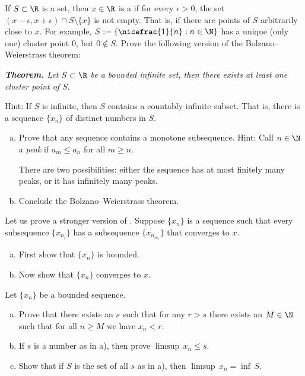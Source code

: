 \documentclass[12pt]{book}
\begin{document}
\begin{exercise}
If $S \subset \R$ is a set, then $x \in \R$ is a \emph{}
if for every $\epsilon > 0$, the set $(x-\epsilon,x+\epsilon) \cap S
\setminus \{ x \}$ is not empty.
That is, if there are points of $S$
arbitrarily close to $x$.
For example, $S := \{ \nicefrac{1}{n} : n \in \N \}$ has a unique (only
one) cluster point $0$, but $0 \notin S$.
Prove the following version of the Bolzano--Weierstrass theorem:

\medskip

\noindent
\emph{\textbf{Theorem.} Let $S \subset \R$ be a bounded infinite set,
then there exists at least one cluster point of $S$}.

\medskip

Hint: If $S$ is infinite, then $S$ contains a countably infinite subset.
That is, there is a sequence $\{ x_n \}$ of distinct numbers in $S$.
\end{exercise}

\begin{exercise}[Challenging]
\begin{enumerate}[a)]
 \item Prove that any sequence contains a monotone subsequence.
Hint: Call $n \in \N$ a \emph{peak} if $a_m \leq a_n$ for all $m \geq n$.

There are two possibilities: either the sequence has at most finitely many
peaks,
or it has infinitely many peaks.
\item Conclude the Bolzano--Weierstrass theorem.
\end{enumerate}
\end{exercise}

\begin{exercise}
Let us prove a stronger version of .
Suppose $\{ x_n \}$ is a sequence such that every subsequence $\{
x_{n_i} \}$ has a subsequence
$\{ x_{n_{m_i}} \}$ that converges to $x$. 
\begin{enumerate}[a)]
\item First show that $\{ x_n \}$ is bounded.
\item Now show that $\{ x_n \}$ converges to $x$.
\end{enumerate}
\end{exercise}

\begin{exercise}
Let $\{x_n\}$ be a bounded sequence.
\begin{enumerate}[a)]
 \item Prove that there exists an $s$ such that for any $r > s$ there exists 
an $M \in \N$ such that for all $n \geq M$ we have
$x_n < r$.
 \item If $s$ is a number as in a), then prove $\limsup \, x_n \leq s$.
  \item Show that if $S$ is the set of all $s$ as in a), then
$\limsup \, x_n = \inf \, S$.
\end{enumerate}
\end{exercise}
\end{document}
